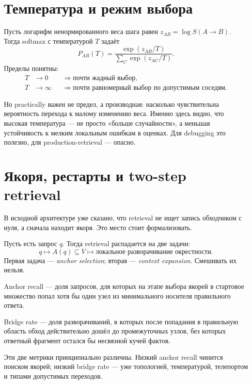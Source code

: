 \section{Температура и режим выбора}

Пусть логарифм ненормированного веса шага равен $z_{AB}=\log S(A\to B)$. Тогда
softmax с температурой $T$ задаёт
\[
P_{AB}(T)=\frac{\exp(z_{AB}/T)}{\sum_C \exp(z_{AC}/T)}.
\]
Пределы понятны:
\[
\begin{aligned}
T &\to 0      && \Rightarrow \text{почти жадный выбор},\\
T &\to \infty && \Rightarrow \text{почти равномерный выбор по допустимым соседям}.
\end{aligned}
\]

Но practically важен не предел, а производная: насколько чувствительна вероятность
перехода к малому изменению веса. Именно здесь видно, что высокая температура — не
просто «больше случайности», а меньшая устойчивость к мелким локальным ошибкам в
оценках. Для debugging это полезно, для production-retrieval — опасно.

\section{Якоря, рестарты и two-step retrieval}
\label{sec:retrievalmathtax}

В исходной архитектуре уже сказано, что retrieval не ищет запись обходчиком с нуля,
а сначала находит якоря. Это место стоит формализовать.

Пусть есть запрос $q$. Тогда retrieval распадается на две задачи:
\[
q \longmapsto A(q)\subseteq V
\longmapsto
\text{локальное разворачивание окрестности}.
\]
Первая задача — \emph{anchor selection}; вторая — \emph{context expansion}. Смешивать
их нельзя.

\begin{definition}
Anchor recall — доля запросов, для которых на этапе выбора якорей в стартовое
множество попал хотя бы один узел из минимального носителя правильного ответа.
\end{definition}

\begin{definition}
Bridge rate — доля разворачиваний, в которых после попадания в правильную область
обход действительно дошёл до промежуточных узлов, без которых ответный фрагмент
остался бы несвязной кучей фактов.
\end{definition}

Эти две метрики принципиально различны. Низкий anchor recall чинится поиском
якорей; низкий bridge rate — уже топологией, температурой, телепортом и типами
допустимых переходов.

